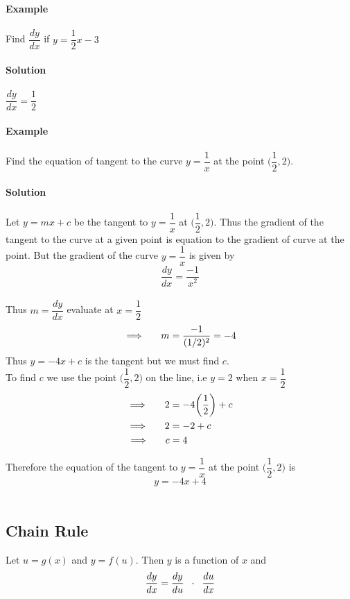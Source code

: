 \documentclass[11pt,a4paper]{article}
\begin{document}
\textbf{Example}\\\\ 
Find $\dfrac{dy}{dx}$ if $y=\dfrac{1}{2}x-3$\\\\
\textbf{Solution}\\\\
$\dfrac{dy}{dx}=\dfrac{1}{2}$\\\\


\textbf{Example}\\\\
Find the equation of tangent to the curve $y=\dfrac{1}{x}$ at the point $\bigg(\dfrac{1}{2},2\bigg)$.\\\\
\textbf{Solution}\\\\
Let $y=mx+c$ be the tangent to $y=\dfrac{1}{x}$ at $\bigg(\dfrac{1}{2},2\bigg)$. Thus the gradient of the tangent to the curve at a  given point is equation to the gradient of curve at the point. But the gradient of the curve $y=\dfrac{1}{x}$ is given by $$\frac{dy}{dx}=\frac{-1}{x^2}$$\\
Thus $m=\dfrac{dy}{dx}$ evaluate at $x=\dfrac{1}{2}$ $$\implies \hspace{0.5cm} m=\frac{-1}{(1/2)^2}=-4$$
Thus $y=-4x+c$ is the tangent but we must find $c$.\\
To find $c$ we use the point $\bigg(\dfrac{1}{2},2\bigg)$ on the line, i.e $y=2$ when $x=\dfrac{1}{2}$  
\begin{align*}
\implies \hspace{0.5cm} 2& = -4\bigg(\frac{1}{2}\bigg)+c\\
\implies \hspace{0.5cm} 2&=-2 +c\\
\implies \hspace{0.5cm} c&=4\\
\end{align*}

Therefore the equation of the tangent to $y=\dfrac{1}{x}$ at the point $\bigg(\dfrac{1}{2},2\bigg)$ is $$y=-4x+4$$\\

\subsection{Chain Rule}
Let $u=g(x)$ and $y=f(u)$. Then $y$ is a function of $x$ and $$\dfrac{dy}{dx}=\frac{dy}{du}\hspace{0.2cm}\cdot \hspace{0.2cm} \dfrac{du}{dx}$$\\
\end{document}
